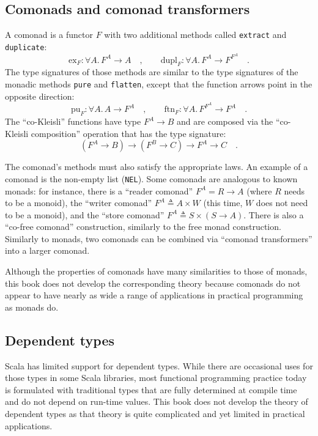 \subsection{Comonads and comonad transformers}

A comonad is a functor $F$ with two additional methods called \lstinline!extract!
and \lstinline!duplicate!:
\[
\text{ex}_{F}:\forall A.\,F^{A}\rightarrow A\quad,\quad\quad\text{dupl}_{F}:\forall A.\,F^{A}\rightarrow F^{F^{A}}\quad.
\]
The type signatures of those methods are similar to the type signatures
of the monadic methods \lstinline!pure! and \lstinline!flatten!,
except that the function arrows point in the opposite direction:
\[
\text{pu}_{F}:\forall A.\,A\rightarrow F^{A}\quad,\quad\quad\text{ftn}_{F}:\forall A.\,F^{F^{A}}\rightarrow F^{A}\quad.
\]
The \textsf{``}co-Kleisli\textsf{''} functions have type $F^{A}\rightarrow B$ and
are composed via the \textsf{``}co-Kleisli composition\textsf{''} operation that has
the type signature:
\[
(F^{A}\rightarrow B)\rightarrow(F^{B}\rightarrow C)\rightarrow F^{A}\rightarrow C\quad.
\]

The comonad\textsf{'}s methods must also satisfy the appropriate laws. An example
of a comonad is the non-empty list (\lstinline!NEL!). Some comonads
are analogous to known monads: for instance, there is a \textsf{``}reader
comonad\textsf{''} $F^{A}=R\rightarrow A$ (where $R$ needs to be a monoid),
the \textsf{``}writer comonad\textsf{''} $F^{A}\triangleq A\times W$ (this time,
$W$ does not need to be a monoid), and the \textsf{``}store comonad\textsf{''} $F^{A}\triangleq S\times(S\rightarrow A)$.
There is also a \textsf{``}co-free comonad\textsf{''} construction, similarly to the
free monad construction. Similarly to monads, two comonads can be
combined via \textsf{``}comonad transformers\textsf{''} into a larger comonad.

Although the properties of comonads have many similarities to those
of monads, this book does not develop the corresponding theory because
comonads do not appear to have nearly as wide a range of applications
in practical programming as monads do.

\subsection{Dependent types}

Scala has limited support for dependent types.
While there are occasional uses for those types in some Scala libraries,
most functional programming practice today is formulated with traditional
types that are fully determined at compile time and do not depend
on run-time values. This book does not develop the theory of dependent
types as that theory is quite complicated and yet limited in practical
applications.

